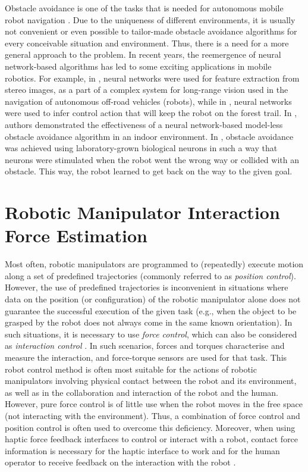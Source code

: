 Obstacle avoidance is one of the tasks that is needed for autonomous mobile robot navigation \cite{Sullivan2017}. Due to the uniqueness of different environments, it is usually not convenient or even possible to tailor-made obstacle avoidance algorithms for every conceivable situation and environment. Thus, there is a need for a more general approach to the problem. In recent years, the reemergence of neural network-based algorithms has led to some exciting applications in mobile robotics. For example, in \cite{Hadsell2009}, neural networks were used for feature extraction from stereo images, as a part of a complex system for long-range vision used in the navigation of autonomous off-road vehicles (robots), while in \cite{Giusti2016}, neural networks were used to infer control action that will keep the robot on the forest trail. In \cite{Tai2016}, authors demonstrated the effectiveness of a neural network-based model-less obstacle avoidance algorithm in an indoor environment. In \cite{Yada2021}, obstacle avoidance was achieved using laboratory-grown biological neurons in such a way that neurons were stimulated when the robot went the wrong way or collided with an obstacle. This way, the robot learned to get back on the way to the given goal.

\section{Robotic Manipulator Interaction Force Estimation}

Most often, robotic manipulators are programmed to (repeatedly) execute motion along a set of predefined trajectories (commonly referred to as \emph{position control}).  However, the use of predefined trajectories is inconvenient in situations where data on the position (or configuration) of the robotic manipulator alone does not guarantee the successful execution of the given task (e.g., when the object to be grasped by the robot does not always come in the same known orientation). In such situations, it is necessary to use \emph{force control}, which can also be considered as \emph{interaction control} \cite{Siciliano1999}. In such scenarios, forces and torques characterise and measure the interaction, and force-torque sensors are used for that task. This robot control method is often most suitable for the actions of robotic manipulators involving physical contact between the robot and its environment, as well as in the collaboration and interaction of the robot and the human. However, pure force control is of little use when the robot moves in the free space (not interacting with the environment). Thus, a combination of force control and position control is often used to overcome this deficiency. Moreover, when using haptic force feedback interfaces to control or interact with a robot, contact force information is necessary for the haptic interface to work and for the human operator to receive feedback on the interaction with the robot \cite{Song2019}.

